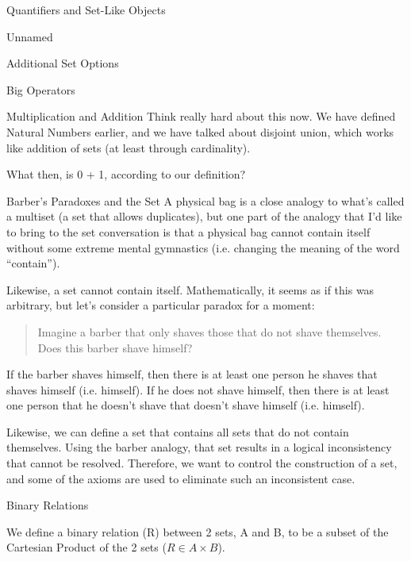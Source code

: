 \begin{part}{Quantifiers and Set-Like Objects}
\begin{chapter}{Unnamed}
\begin{section}{Additional Set Options}
\begin{subsection}{Big Operators}
                
            \end{subsection}
            
            \begin{subsection}{Multiplication and Addition}
                Think really hard about this now. We have defined Natural Numbers earlier, and we have talked about disjoint union, which works like addition of sets (at least through cardinality).
                
                What then, is 0 + 1, according to our definition?
                
            \end{subsection}
            
        \end{section}
        \begin{section}{Barber's Paradoxes and the Set}
            A physical bag is a close analogy to what's called a multiset (a set that allows duplicates), but one part of the analogy that I'd like to bring to the set conversation is that a physical bag cannot contain itself without some extreme mental gymnastics (i.e. changing the meaning of the word ``contain'').
            
            Likewise, a set cannot contain itself. Mathematically, it seems as if this was arbitrary, but let's consider a particular paradox for a moment:
            \begin{quote}
                Imagine a barber that only shaves those that do not shave themselves. Does this barber shave himself?
            \end{quote}
            
            If the barber shaves himself, then there is at least one person he shaves that shaves himself (i.e. himself). If he does not shave himself, then there is at least one person that he doesn't shave that doesn't shave himself (i.e. himself).
            
            Likewise, we can define a set that contains all sets that do not contain themselves. Using the barber analogy, that set results in a logical inconsistency that cannot be resolved. Therefore, we want to control the construction of a set, and some of the axioms are used to eliminate such an inconsistent case.
        \end{section}
    \end{chapter}
    
    \begin{chapter}{Binary Relations}
        \begin{definition}
            We define a binary relation (R) between 2 sets, A and B, to be a subset of the Cartesian Product of the 2 sets ($R \in A \times B$).
        \end{definition}
        

\end{chapter}
\end{part}
